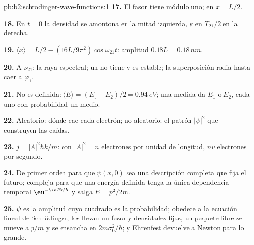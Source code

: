 \begin{solution}{pb:b2:schrodinger-wave-functions:1}
\textbf{17.} El fasor tiene módulo uno; en $x = L/2$.

\textbf{18.} En $t = 0$ la densidad se amontona en la mitad izquierda, y en
$T_{21}/2$ en la derecha.

\textbf{19.} $\langle x\rangle = L/2 - (16L/9\pi^2)\cos\omega_{21}t$: amplitud
$0.18L = \qty{0.18}{nm}$.

\textbf{20.} A $\nu_{21}$: la raya espectral; un  no tiene
 y es estable; la superposición radia hasta caer
a $\varphi_1$.

\textbf{21.} No es definida: $\langle E\rangle = (E_1 + E_2)/2 = \qty{0.94}{eV}$; una
medida da $E_1$ o $E_2$, cada uno con probabilidad un medio.

\textbf{22.} Aleatorio: dónde cae cada electrón; no aleatorio: el
patrón $|\psi|^2$ que construyen las caídas.

\textbf{23.} $j = |A|^2\hbar k/m$: con $|A|^2 = n$ electrones por unidad de longitud,
$nv$ electrones por segundo.

\textbf{24.} De primer orden para que $\psi(x,0)$ sea una descripción completa
que fija el futuro; compleja para que una energía definida tenga la
única dependencia temporal $\eu^{-\iu Et/\hbar}$ y salga $E = p^2/2m$.

\textbf{25.} $\psi$ es la amplitud cuyo cuadrado es la probabilidad; obedece
a la ecuación lineal de Schrödinger; los  llevan un
fasor y densidades fijas; un paquete libre se mueve a $p/m$ y se ensancha
en $2m\sigma_0^2/\hbar$; y Ehrenfest devuelve a Newton para lo grande.
\end{solution}
